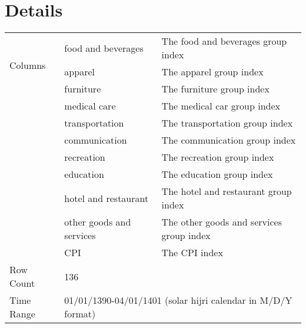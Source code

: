 \documentclass[fleqn]{report}
\begin{document}
\section*{Details}
\begin{center}
    \begin{tabular}{|l|ll|}
        \hline
        \multirow{3}{*}{Columns} & \multicolumn{1}{l|}{food and beverages}       & The food and beverages group index                            \\ \cline{2-3} 
                                 & \multicolumn{1}{l|}{apparel}  & The apparel group index      \\ \cline{2-3}
                                 & \multicolumn{1}{l|}{furniture}  & The furniture group index      \\ \cline{2-3}
                                 & \multicolumn{1}{l|}{medical care}  & The medical car group index    \\ \cline{2-3}
                                 & \multicolumn{1}{l|}{transportation}  & The transportation group index      \\ \cline{2-3}
                                 & \multicolumn{1}{l|}{communication}  & The communication group index      \\ \cline{2-3}
                                 & \multicolumn{1}{l|}{recreation}  & The recreation group index      \\ \cline{2-3}
                                 & \multicolumn{1}{l|}{education}  & The education group index      \\ \cline{2-3}
                                 & \multicolumn{1}{l|}{hotel and restaurant}  & The hotel and restaurant group index      \\ \cline{2-3}
                                 & \multicolumn{1}{l|}{other goods and services}  & The other goods and services group index      \\ \cline{2-3}
                                 & \multicolumn{1}{l|}{CPI}  & The CPI index      \\ \cline{2-3} \hline
        Row Count                & \multicolumn{2}{l|}{136}                                                        \\ \hline
        Time Range               & \multicolumn{2}{l|}{01/01/1390-04/01/1401 (solar hijri calendar in M/D/Y format)}                         \\ \hline
    \end{tabular}
\end{center}
\end{document}
